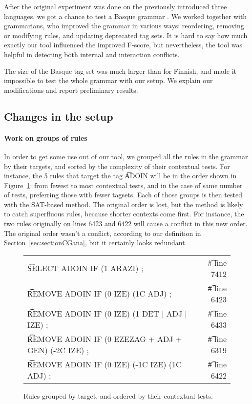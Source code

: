 {{After the original experiment was done on the previously introduced
three languages, we got a chance to test a Basque grammar
\cite{aduriz1997euscg}. We worked together with grammarians, who
improved the grammar in various ways: reordering, removing or
modifying rules, and updating deprecated tag sets. It is hard to
say how much exactly our tool influenced the improved F-score, but
nevertheless, the tool was helpful in detecting both internal and
interaction conflicts.

The size of the Basque tag set was much larger than for Finnish, and
made it impossible to test the whole grammar with our setup. We
explain our modifications and report preliminary results.

\subsection{Changes in the setup}
\label{sec:basqueChanges}

\paragraph{Work on groups of rules} In order to get some use out of our tool, we grouped all the rules in the
grammar by their targets, and sorted by the complexity of their
contextual tests. For instance, the 5 rules that target the tag
\t{ADOIN} will be in the order shown in Figure~\ref{fig:basqueSorted}:
from fewest to most contextual tests, and in the case of same number
of tests, preferring those with fewer tagsets.  Each of those groups
is then tested with the SAT-based method. The original order is lost,
but the method is likely to catch superfluous rules, because
shorter contexts come first. For instance, the two rules originally on
lines 6423 and 6422 will cause a conflict in this new order. The
original order wasn't a conflict, according to our definition in
Section~\ref{sec:sectionCGana}, but it certainly looks redundant.


\begin{figure}[h]
\centering
\begin{tabular}{lr}
\t{SELECT ADOIN IF (1 ARAZI) ;}                         & \t{\# line 7412} \\
\t{REMOVE ADOIN IF (0 IZE) (1C ADJ) ;}                  & \t{\# line 6423} \\
\t{REMOVE ADOIN IF (0 IZE) (1 DET | ADJ | IZE) ;}       & \t{\# line 6433} \\
\t{REMOVE ADOIN IF (0 EZEZAG + ADJ + GEN) (-2C IZE) ;}  & \t{\# line 6319} \\
\t{REMOVE ADOIN IF (0 IZE) (-1C IZE) (1C ADJ) ;}        & \t{\# line 6422} \\
\end{tabular}
\caption{Rules grouped by target, and ordered by their contextual tests.}
\label{fig:basqueSorted}
\end{figure}

}}

